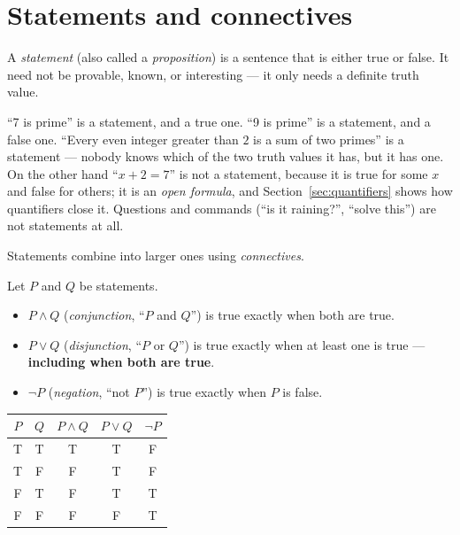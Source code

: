 \section{Statements and connectives}\label{sec:statements}

\begin{definition}[Statement]
A \emph{statement} (also called a \emph{proposition}) is a sentence that is either
true or false. It need not be provable, known, or interesting --- it only needs a
definite truth value.
\end{definition}

``7 is prime'' is a statement, and a true one. ``9 is prime'' is a statement, and a
false one. ``Every even integer greater than $2$ is a sum of two primes'' is a
statement --- nobody knows which of the two truth values it has, but it has one.
On the other hand ``$x+2=7$'' is not a statement, because it is true for some $x$
and false for others; it is an \emph{open formula}, and
Section~\ref{sec:quantifiers} shows how quantifiers close it. Questions and
commands (``is it raining?'', ``solve this'') are not statements at all.

Statements combine into larger ones using \emph{connectives}.

\begin{definition}
Let $P$ and $Q$ be statements.
\begin{itemize}
\item $P \land Q$ (\emph{conjunction}, ``$P$ and $Q$'') is true exactly when both are true.
\item $P \lor Q$ (\emph{disjunction}, ``$P$ or $Q$'') is true exactly when at least one
is true --- \textbf{including when both are true}.
\item $\lnot P$ (\emph{negation}, ``not $P$'') is true exactly when $P$ is false.
\end{itemize}
\end{definition}

\begin{center}
\begin{tabular}{cc|ccc}
\toprule
$P$ & $Q$ & $P\land Q$ & $P\lor Q$ & $\lnot P$\\
\midrule
T & T & T & T & F\\
T & F & F & T & F\\
F & T & F & T & T\\
F & F & F & F & T\\
\bottomrule
\end{tabular}
\end{center}

